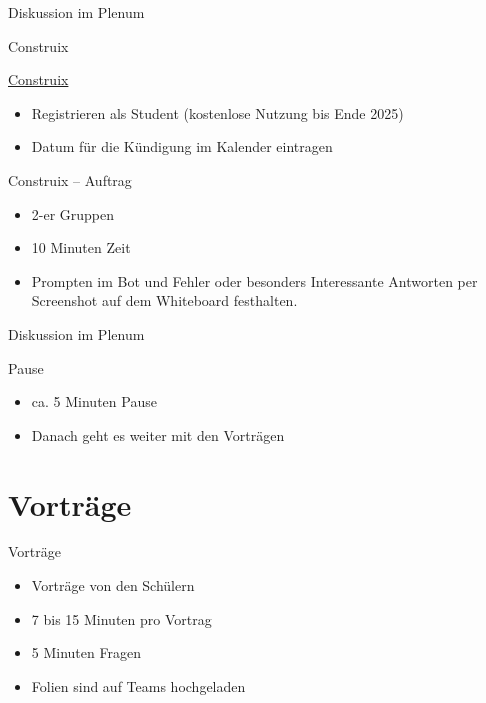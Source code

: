 \begin{frame}{Diskussion im Plenum}

\end{frame}


\begin{frame}{Construix}

\href{https://www.baumeister.ch/construix-start/}{Construix}

\begin{itemize}
    \item Registrieren als Student (kostenlose Nutzung bis Ende 2025)
    \item Datum für die Kündigung im Kalender eintragen
\end{itemize}

\end{frame}


\begin{frame}{Construix -- Auftrag}
    \begin{itemize}
        \item[\textbullet] 2-er Gruppen
        \item[\textbullet] 10 Minuten Zeit
        \item[\textbullet] Prompten im Bot und Fehler oder besonders Interessante Antworten per Screenshot auf dem Whiteboard festhalten.
    \end{itemize}
\end{frame}

\begin{frame}{Diskussion im Plenum}

\end{frame}


\begin{frame}{Pause}
    \begin{itemize}
        \item[\textbullet] ca. 5 Minuten Pause
        \item[\textbullet] Danach geht es weiter mit den Vorträgen
    \end{itemize}

\end{frame}


\section{Vorträge}
\BlueSectionSlide

\begin{frame}{Vorträge}
    \begin{itemize}
        \item[\textbullet] Vorträge von den Schülern
        \item[\textbullet] 7 bis 15 Minuten pro Vortrag
        \item[\textbullet] 5 Minuten Fragen
        \item[\textbullet] Folien sind auf Teams hochgeladen
    \end{itemize}
\end{frame}


